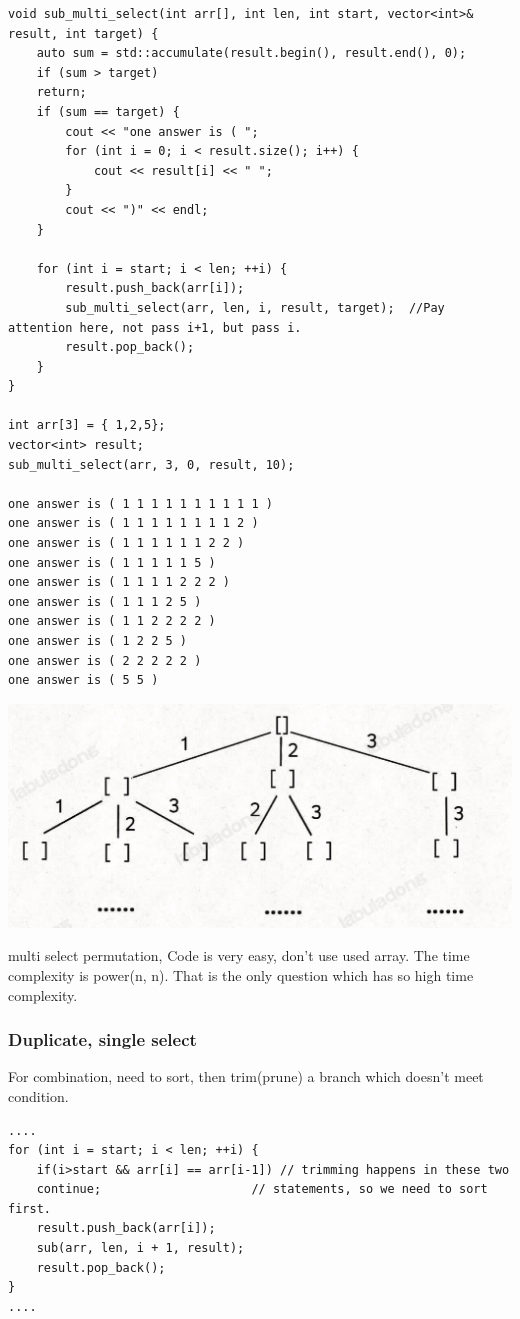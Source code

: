 \documentclass[a4paper,11pt,twoside]{book}
\begin{document}
\begin{lstlisting}
void sub_multi_select(int arr[], int len, int start, vector<int>& result, int target) {
	auto sum = std::accumulate(result.begin(), result.end(), 0);
	if (sum > target)
	return;
	if (sum == target) {
		cout << "one answer is ( ";
		for (int i = 0; i < result.size(); i++) {
			cout << result[i] << " ";
		}
		cout << ")" << endl;
	}
	
	for (int i = start; i < len; ++i) {
		result.push_back(arr[i]);
		sub_multi_select(arr, len, i, result, target);  //Pay attention here, not pass i+1, but pass i. 
		result.pop_back();
	}
}

int arr[3] = { 1,2,5};
vector<int> result;
sub_multi_select(arr, 3, 0, result, 10);

one answer is ( 1 1 1 1 1 1 1 1 1 1 )
one answer is ( 1 1 1 1 1 1 1 1 2 )
one answer is ( 1 1 1 1 1 1 2 2 )
one answer is ( 1 1 1 1 1 5 )
one answer is ( 1 1 1 1 2 2 2 )
one answer is ( 1 1 1 2 5 )
one answer is ( 1 1 2 2 2 2 )
one answer is ( 1 2 2 5 )
one answer is ( 2 2 2 2 2 )
one answer is ( 5 5 )

\end{lstlisting}

\begin{center}
	\includegraphics[width=0.7\linewidth]{pics/sub_multi}
\end{center}

	\par multi select permutation, Code is very easy, don't use used array. The time complexity is power(n, n). That is the only question which has so high time complexity. 
	


\subsubsection{Duplicate, single select}

	
	\par For combination, need to sort, then trim(prune) a branch which doesn't meet condition. 
\begin{lstlisting}
....
for (int i = start; i < len; ++i) {
	if(i>start && arr[i] == arr[i-1]) // trimming happens in these two 
	continue;                     // statements, so we need to sort first. 
	result.push_back(arr[i]);  
	sub(arr, len, i + 1, result);
	result.pop_back();
}	
....	
\end{lstlisting}
\end{document}
